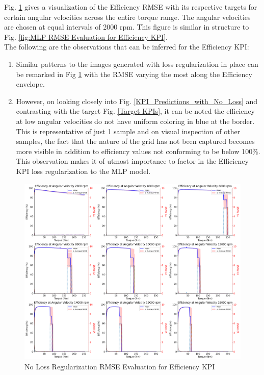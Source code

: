 \documentclass{report} %
\begin{document}
Fig. \ref{fig:No Loss Regularization RMSE Evaluation for Efficiency KPI} gives a visualization of the Efficiency \ac{RMSE} with its respective targets 
for certain angular velocities across the entire torque range. The angular velocities are chosen at equal intervals of 2000 rpm. 
This figure is similar in structure to Fig. \ref{fig:MLP RMSE Evaluation for Efficiency KPI}.\\

The following are the observations that can be inferred for the Efficiency \ac{KPI}:
\begin{enumerate}[nosep]
    \item Similar patterns to the images generated with loss regularization in place can be remarked 
    in Fig \ref{fig:No Loss Regularization RMSE Evaluation for Efficiency KPI} with the \ac{RMSE} varying the most along the Efficiency envelope.
    \item However, on looking closely into Fig. \ref{KPI_Predictions_with_No_Loss} and contrasting with the target Fig. \ref{Target KPIs}, it can be noted the efficiency 
    at low angular velocities do not have uniform coloring in blue at the border. This is representative of just 1 sample and on visual inspection of other samples, the fact that the 
    nature of the grid has not been captured becomes more visible in addition to efficiency values not conforming to be below 100\%.
    This observation makes it of utmost importance to factor in the Efficiency \ac{KPI} loss regularization to the \ac{MLP} model.\\
\end{enumerate}

\begin{figure}[H]
    \centering
    \includegraphics[width=1\textwidth]{./ReportImages/rmse_eta_no_lossreg_MLP.png} 
    \caption{No Loss Regularization \ac{RMSE} Evaluation for Efficiency \ac{KPI}} 
    \label{fig:No Loss Regularization RMSE Evaluation for Efficiency KPI}
\end{figure}
\end{document}

